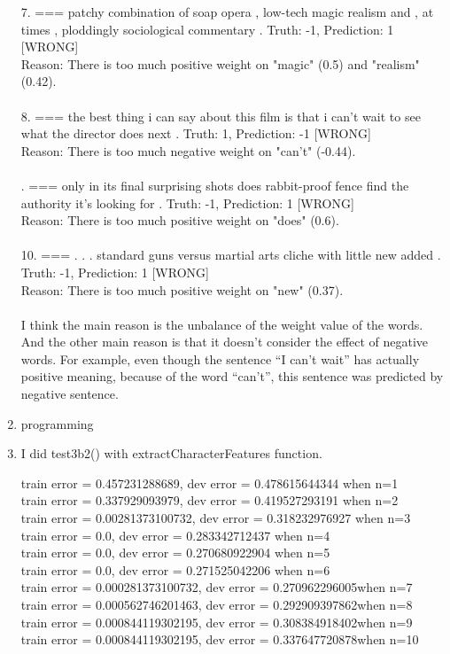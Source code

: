 \documentclass[12pt]{article}
\begin{document}
\begin{enumerate}[label=(\alph*)]
  7. === patchy combination of soap opera , low-tech magic realism and , at times , ploddingly sociological commentary .
  Truth: -1, Prediction: 1 [WRONG]\\
  Reason: There is too much positive weight on "magic" (0.5) and "realism"(0.42).\\\\
  8. === the best thing i can say about this film is that i can't wait to see what the director does next .
  Truth: 1, Prediction: -1 [WRONG]\\
  Reason: There is too much negative weight on "can't" (-0.44).\\\\
  . === only in its final surprising shots does rabbit-proof fence find the authority it's looking for .
  Truth: -1, Prediction: 1 [WRONG]\\
  Reason: There is too much positive weight on "does" (0.6).\\\\
  10. === . . . standard guns versus martial arts cliche with little new added .
  Truth: -1, Prediction: 1 [WRONG]\\
  Reason: There is too much positive weight on "new" (0.37).\\\\

   I think the main reason is the unbalance of the weight value of the words. And the other main reason is that it doesn't consider the effect of negative words. For example, even though the sentence ``I can't wait'' has actually positive meaning,
  because of the word ``can't'', this sentence was predicted by negative sentence.

  \item programming
  \item
  I did test3b2() with extractCharacterFeatures function.

  train error = 0.457231288689, dev error = 0.478615644344 \qquad when n=1\\
  train error = 0.337929093979, dev error = 0.419527293191 \qquad when n=2\\
  train error = 0.00281373100732, dev error = 0.318232976927 \qquad when n=3\\
  train error = 0.0, dev error = 0.283342712437 \qquad when n=4\\
  train error = 0.0, dev error = 0.270680922904 \qquad when n=5\\
  train error = 0.0, dev error = 0.271525042206 \qquad when n=6\\
  train error = 0.000281373100732, dev error = 0.270962296005\qquad when n=7\\
  train error = 0.000562746201463, dev error = 0.292909397862\qquad when n=8\\
  train error = 0.000844119302195, dev error = 0.308384918402\qquad when n=9\\
  train error = 0.000844119302195, dev error = 0.337647720878\qquad when n=10\\\\


\end{enumerate}
\end{document}
